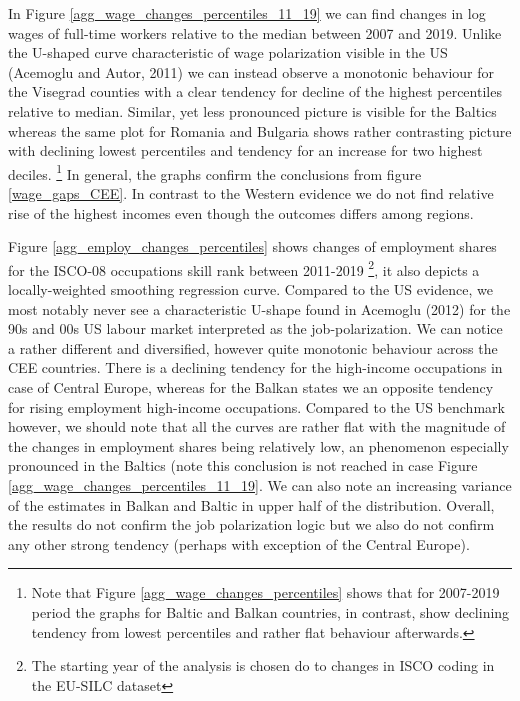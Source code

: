 \documentclass{article}
\begin{document}
In Figure \ref{agg_wage_changes_percentiles_11_19} we can find changes in log wages of full-time workers relative to the median between 2007 and 2019. Unlike the U-shaped curve characteristic of wage polarization visible in the US (Acemoglu and Autor, 2011) we can instead observe a monotonic behaviour for the Visegrad counties with a clear tendency for decline of the highest percentiles relative to median. Similar, yet less pronounced picture is visible for the Baltics whereas the same plot for Romania and Bulgaria shows rather contrasting picture with declining lowest percentiles and tendency for an increase for two highest deciles.
\footnote{Note that Figure \ref{agg_wage_changes_percentiles} shows that for 2007-2019 period the graphs for Baltic and Balkan countries, in contrast, show declining tendency from lowest percentiles and rather flat behaviour afterwards.} In general, the graphs confirm the conclusions from figure \ref{wage_gaps_CEE}. In contrast to the Western evidence we do not find relative rise of the highest incomes even though the outcomes differs among regions.


Figure \ref{agg_employ_changes_percentiles} shows changes of employment shares for the ISCO-08 occupations skill rank between 2011-2019 \footnote{The starting year of the analysis is chosen do to changes in ISCO coding in the EU-SILC dataset}, it also depicts a locally-weighted smoothing regression curve. Compared to the US evidence, we most notably never see a characteristic U-shape found in Acemoglu (2012) for the 90s and 00s US labour market interpreted as the job-polarization. We can notice a rather different and diversified, however quite monotonic behaviour across the CEE countries. There is a declining tendency for the high-income occupations in case of Central Europe, whereas for the Balkan states we an opposite tendency for rising employment high-income occupations. Compared to the US benchmark however, we should note that all the curves are rather flat with the magnitude of the changes in employment shares being relatively low, an phenomenon especially pronounced in the Baltics (note this conclusion is not reached in case Figure \ref{agg_wage_changes_percentiles_11_19}. We can also note an increasing variance of the estimates in Balkan and Baltic in upper half of the distribution. Overall, the results do not confirm the job polarization logic but we also do not confirm any other strong tendency (perhaps with exception of the Central Europe). 
\end{document}
